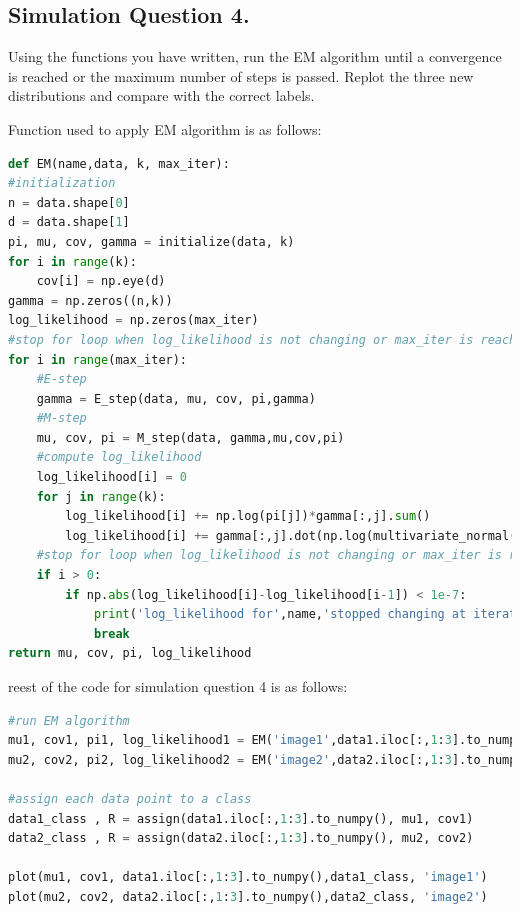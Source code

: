\documentclass[12pt]{article}
\begin{document}
\subsection{Simulation Question 4.}
Using the functions you have written, run the EM algorithm until a convergence is reached or the maximum number of steps is passed. Replot the three new distributions and compare with the correct labels.
\begin{qsolve}
    Function used to apply EM algorithm is as follows:
    \begin{lstlisting}[language=Python,caption={EM algorithm},label={code:EM algorithm}]
        def EM(name,data, k, max_iter):
#initialization
n = data.shape[0]
d = data.shape[1]
pi, mu, cov, gamma = initialize(data, k)
for i in range(k):
    cov[i] = np.eye(d)
gamma = np.zeros((n,k))
log_likelihood = np.zeros(max_iter)
#stop for loop when log_likelihood is not changing or max_iter is reached
for i in range(max_iter):
    #E-step
    gamma = E_step(data, mu, cov, pi,gamma)
    #M-step
    mu, cov, pi = M_step(data, gamma,mu,cov,pi)
    #compute log_likelihood
    log_likelihood[i] = 0
    for j in range(k):
        log_likelihood[i] += np.log(pi[j])*gamma[:,j].sum()
        log_likelihood[i] += gamma[:,j].dot(np.log(multivariate_normal(mu[j],cov[j]).pdf(data)))
    #stop for loop when log_likelihood is not changing or max_iter is reached
    if i > 0:
        if np.abs(log_likelihood[i]-log_likelihood[i-1]) < 1e-7:
            print('log_likelihood for',name,'stopped changing at iteration',i)
            break
return mu, cov, pi, log_likelihood
        \end{lstlisting}
    \splitqsolve
    reest of the code for simulation question 4 is as follows:
    \begin{lstlisting}[language=Python,caption={EM algorithm},label={code:EM algorithm}]
#run EM algorithm
mu1, cov1, pi1, log_likelihood1 = EM('image1',data1.iloc[:,1:3].to_numpy(), 3, 200)
mu2, cov2, pi2, log_likelihood2 = EM('image2',data2.iloc[:,1:3].to_numpy(), 3, 200)

#assign each data point to a class
data1_class , R = assign(data1.iloc[:,1:3].to_numpy(), mu1, cov1)
data2_class , R = assign(data2.iloc[:,1:3].to_numpy(), mu2, cov2)

plot(mu1, cov1, data1.iloc[:,1:3].to_numpy(),data1_class, 'image1')
plot(mu2, cov2, data2.iloc[:,1:3].to_numpy(),data2_class, 'image2')
            \end{lstlisting}
    \splitqsolve


\end{qsolve}
\end{document}
